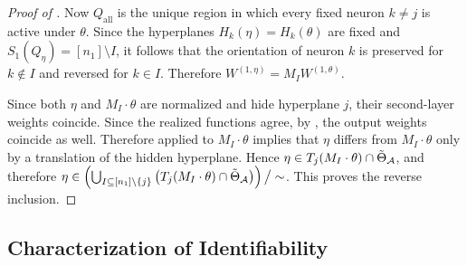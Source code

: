 \documentclass{article}
\theoremstyle{definition}
\newcommand{\architecture}{\mathcal{A}}
\newcommand{\gparamspace}[1]{\Tilde{\Theta}_{#1}}
\newcommand{\weights}[1]{W^{(#1)}}
\newcommand{\modulo}[1]{\big/#1}
\begin{document}
\begin{proof}[Proof of ]
Now $Q_{\mathrm{all}}$ is the unique region in which every fixed neuron $k\neq j$ is active under $\theta$. Since the hyperplanes $H_k(\eta)=H_k(\theta)$ are fixed  and $S_1(Q_\eta)=[n_1]\setminus I$, it follows that the orientation of neuron $k$ is preserved for $k\notin I$ and reversed for $k\in I$. Therefore
$\weights{1,\eta}=M_I\weights{1,\theta}$. 

Since both $\eta$ and $M_I\cdot\theta$ are normalized and hide hyperplane $j$, their second-layer weights coincide. Since the realized functions agree, by , the output weights coincide as well. Therefore  applied to $M_I\cdot\theta$ implies that $\eta$ differs from $M_I\cdot\theta$ only by a translation of the hidden hyperplane. Hence
$\eta \in T_j(M_I\cdot\theta) \cap \gparamspace{\architecture}$, 
and therefore
$
\eta
\in
\left(
\bigcup_{I \subseteq [n_1]\setminus\{j\}}
\left(T_j(M_I\cdot\theta)\cap \gparamspace{\architecture}\right)
\right)\modulo{\sim}
$. 
This proves the reverse inclusion.
\end{proof}



\subsection{Characterization of Identifiability} 

\polytimeequivalencebottleneck*
\end{document}
